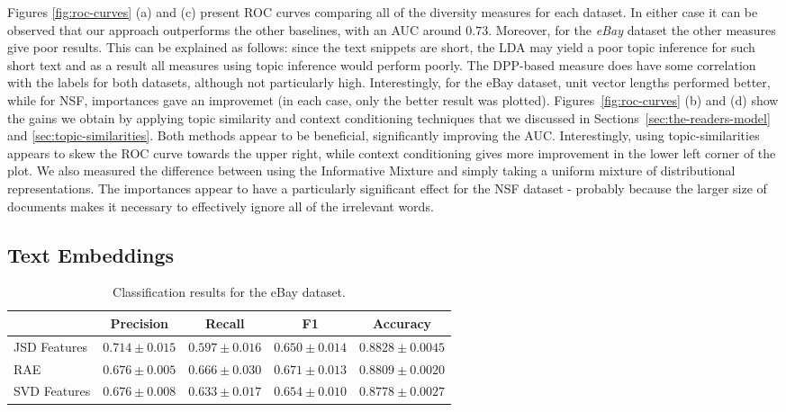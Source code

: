 Figures \ref{fig:roc-curves} (a) and (c)
present ROC curves comparing all of the diversity measures for each dataset.
In either case it can be observed
that our approach outperforms the other baselines, with an AUC
around $0.73$. Moreover, for the {\em eBay} dataset the other measures
give poor results. This can be explained as follows: since the
text snippets are short, the LDA may yield a poor topic inference for
such short text and as a result all measures using topic inference
would perform poorly. The DPP-based measure does have some correlation
with the labels for both datasets, although not particularly
high. Interestingly, for the eBay dataset, unit vector lengths
performed better, while for NSF, importances gave an improvemet (in
each case, only the better result was
plotted). Figures~\ref{fig:roc-curves} (b) and (d) 
show the gains we obtain by applying topic
similarity and context conditioning techniques that we
discussed in Sections~\ref{sec:the-readers-model} and
\ref{sec:topic-similarities}. Both methods appear to be beneficial,
significantly improving the AUC. Interestingly, using
topic-similarities appears to skew the ROC curve towards the upper
right, while context conditioning gives more improvement in the lower
left corner of the plot. We also measured the difference between using 
the Informative Mixture and simply taking a uniform mixture of
distributional representations. The importances appear to have a
particularly significant effect for the NSF dataset - probably because
the larger size of documents makes it necessary to effectively ignore all of
the irrelevant words.

\subsection{Text Embeddings}
\label{sec:text-embeddings}

\begin{table*}[t]
\label{tab:classification-results}
\begin{center}
\begin{tabular}{|l|c|c|c|c|}
\hline
&Precision & Recall & F1 & Accuracy
\\ \hline 
JSD Features         &$\mathbf{0.714}\pm 0.015$&$0.597\pm 0.016$&$0.650\pm
0.014$& $\mathbf{0.8828}\pm 0.0045$\\
RAE             &$0.676\pm 0.005$&$\mathbf{0.666}\pm 0.030$&$\mathbf{0.671}\pm
0.013$&$0.8809\pm 0.0020$ \\
SVD Features             &$0.676\pm 0.008$&$0.633\pm 0.017$&$0.654\pm
0.010$&$0.8778\pm 0.0027$\\
\hline
\end{tabular}
\caption{Classification results for the eBay dataset.}
\end{center}
\end{table*}


